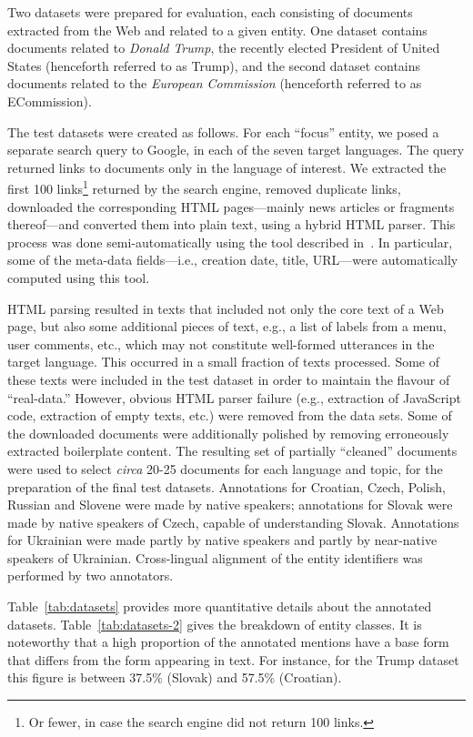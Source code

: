 \documentclass[11pt]{article}
\begin{document}
Two datasets were prepared for evaluation, each consisting of documents extracted from the Web
and related to a given entity.  One dataset contains documents related to {\em Donald Trump}, the
recently elected President of United States (henceforth referred to as {\sc Trump}), and the
second dataset contains documents related to the {\em European Commission} (henceforth referred to
as {\sc ECommission}).

The test datasets were created as follows.  For each ``focus'' entity, we posed a separate
search query to Google, in each of the seven target languages.  The query returned links to
documents only in the language of interest.  We extracted the first 100 links\footnote{Or
  fewer, in case the search engine did not return 100 links.} returned by the search engine,
removed duplicate links, downloaded the corresponding HTML pages---mainly news articles or
fragments thereof---and converted them into plain text, using a hybrid HTML parser.  This
process was done semi-automatically using the tool described in~\cite{Crawley:ea:2010}.  In
particular, some of the meta-data fields---i.e., creation date, title, URL---were automatically
computed using this tool.

HTML parsing resulted in texts that included not only the core text of a Web page, but also
some additional pieces of text, e.g., a list of labels from a menu, user comments, etc., which
may not constitute well-formed utterances in the target language.  This occurred in a small
fraction of texts processed.  Some of these texts were included in the test dataset in order
to maintain the flavour of ``real-data.''  However, obvious HTML parser failure (e.g.,
extraction of JavaScript code, extraction of empty texts, etc.) were removed from the data
sets.  Some of the downloaded documents were additionally polished by removing erroneously
extracted boilerplate content.  The resulting set of partially ``cleaned'' documents were used
to select {\em circa} 20-25 documents for each language and topic, for the preparation of the
final test datasets.  Annotations for Croatian, Czech, Polish, Russian and Slovene were made
by native speakers; annotations for Slovak were made by native speakers of Czech, capable of
understanding Slovak.  Annotations for Ukrainian were made partly by native speakers and
partly by near-native speakers of Ukrainian.  Cross-lingual alignment of the entity
identifiers was performed by two annotators.

Table~\ref{tab:datasets} provides more quantitative details about the annotated datasets.
Table~\ref{tab:datasets-2} gives the breakdown of entity classes.  It is noteworthy that a
high proportion of the annotated mentions have a base form that differs from the form
appearing in text.  For instance, for the {\sc Trump} dataset this figure is between 37.5\%
(Slovak) and 57.5\% (Croatian).
\end{document}
